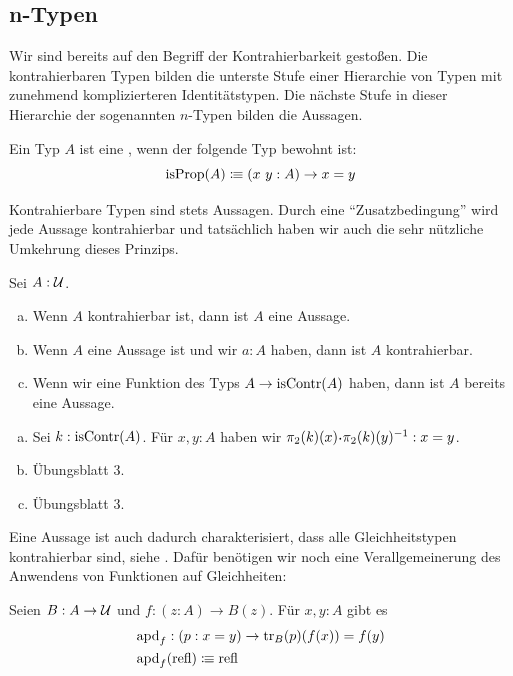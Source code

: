 \subsection{n-Typen}

Wir sind bereits auf den Begriff der Kontrahierbarkeit gestoßen.
Die kontrahierbaren Typen bilden die unterste Stufe einer Hierarchie
von Typen mit zunehmend komplizierteren Identitätstypen.
Die nächste Stufe in dieser Hierarchie der sogenannten $n$-Typen bilden die Aussagen.

\begin{definition}
  Ein Typ $A$ ist eine , wenn der folgende Typ bewohnt ist:
  \[
    \mathrm{isProp}(A)\vcentcolon\mspace{-1.2mu}\equiv (x\ y : A)\to x=y
  \]
\end{definition}

Kontrahierbare Typen sind stets Aussagen.
Durch eine ``Zusatzbedingung'' wird jede Aussage kontrahierbar und tatsächlich haben wir auch die sehr nützliche Umkehrung dieses Prinzips.

\begin{bemerkung}
  Sei $A:\mathcal{U}$.
  \begin{enumerate}[(a)]
  \item Wenn $A$ kontrahierbar ist, dann ist $A$ eine Aussage.
  \item Wenn $A$ eine Aussage ist und wir $a:A$ haben, dann ist $A$ kontrahierbar.
  \item Wenn wir eine Funktion des Typs $A\to \mathrm{isContr}(A)$ haben, dann ist $A$ bereits eine Aussage. 
  \end{enumerate}
\end{bemerkung}

\begin{beweis}
  \begin{enumerate}[(a)]
  \item Sei $k:\mathrm{isContr}(A)$. Für $x,y:A$ haben wir $\pi_2(k)(x)\kon\pi_2(k)(y)^{-1}:x=y$.
  \item Übungsblatt 3.
  \item Übungsblatt 3.
  \end{enumerate}
\end{beweis}

Eine Aussage ist auch dadurch charakterisiert, dass alle Gleichheitstypen kontrahierbar sind, siehe .
Dafür benötigen wir noch eine Verallgemeinerung des Anwendens von Funktionen auf Gleichheiten:

\begin{definition}
  Seien $B:A\to \mathcal{U}$ und $f:(z:A)\to B(z)$.
  Für $x,y:A$ gibt es
  \begin{align*}
    &\mathrm{apd}_f : (p:x=y) \to \mathrm{tr}_B(p)(f(x))=f(y) \\
    &\mathrm{apd}_f(\mathrm{refl})\vcentcolon\mspace{-1.2mu}\equiv \mathrm{refl}
  \end{align*}
\end{definition}

